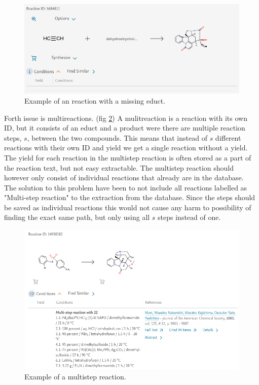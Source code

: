 \documentclass[a4paper,10pt,titlepage]{paper}
\begin{document}
\begin{figure}[H]
\hspace{-1cm}
\includegraphics[scale=0.5]{Billeder/MissingIngredientReaction.png}
\caption{Example of an reaction with a missing educt.}
\label{fig::NoCompound}
\end{figure}

Forth issue is multireactions. (fig \ref{fig::Multistep}) A mulitreaction is a reaction with its own ID, but it consists of an educt and a product were there are multiple reaction steps, $s$, between the two compounds. This means that instead of $s$ different reactions with their own ID and yield we get a single reaction without a yield. The yield for each reaction in the multistep reaction is often stored as a part of the reaction text, but not easy extractable. The multistep reaction should however only consist of individual reactions that already are in the database.\\
The solution to this problem have been to not include all reactions labelled as "Multi-step reaction" to the extraction from the database. Since the steps should be saved as individual reactions this would not cause any harm to possibility of finding the exact same path, but only using all $s$ steps instead of one.

\begin{figure}[H]
\hspace{-1cm}
\includegraphics[scale=0.5]{Billeder/MultistepReactions.png}
\caption{Example of a multistep reaction.}
\label{fig::Multistep}
\end{figure}
\end{document}

